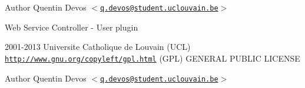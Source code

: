 \begin{DoxyAuthor}{Author}
Quentin Devos $<$\href{mailto:q.devos@student.uclouvain.be}{\tt q.devos@student.uclouvain.be}$>$
\end{DoxyAuthor}
Web Service Controller -\/ User plugin

2001-\/2013 Universite Catholique de Louvain (UCL)  \href{http://www.gnu.org/copyleft/gpl.html}{\tt http://www.gnu.org/copyleft/gpl.html} (GPL) GENERAL PUBLIC LICENSE

\begin{DoxyAuthor}{Author}
Quentin Devos $<$\href{mailto:q.devos@student.uclouvain.be}{\tt q.devos@student.uclouvain.be}$>$ 
\end{DoxyAuthor}
